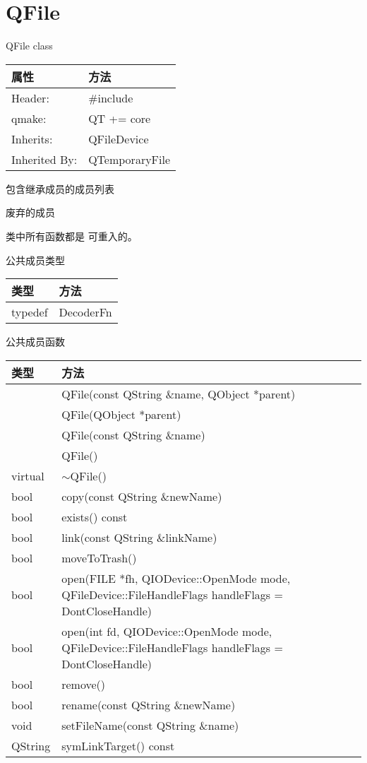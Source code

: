 \chapter{QFile}

QFile class 

\splitLine 

\begin{tabular}{|l|l|}
\hline
属性 	&方法\\
\hline
Header: &	\#include\\
\hline
qmake: &	QT += core\\
\hline
Inherits: &	QFileDevice\\
\hline
Inherited By:& 	QTemporaryFile\\
\hline
\end{tabular}

\begin{compactitem}
\item 包含继承成员的成员列表
\item 废弃的成员
\end{compactitem}


\begin{notice}
	类中所有函数都是 可重入的。
\end{notice}
 

\splitLine

公共成员类型

\begin{tabular}{|l|l|}
\hline
类型& 	方法\\
\hline
typedef& 	DecoderFn\\
\hline
\end{tabular}

\splitLine

公共成员函数

\begin{tabular}{|l|l|}
\hline
类型& 	方法\\
\hline
	&QFile(const QString \&name, QObject *parent)\\
\hline
	&QFile(QObject *parent)\\
\hline
	&QFile(const QString \&name)\\
\hline
	&QFile()\\
\hline
virtual& 	$\sim$QFile()\\
\hline
bool& 	copy(const QString \&newName)\\
\hline
bool& 	exists() const\\
\hline
bool& 	link(const QString \&linkName)\\
\hline
bool& 	moveToTrash()\\
\hline
bool& 	open(FILE *fh, QIODevice::OpenMode mode,
      QFileDevice::FileHandleFlags handleFlags = DontCloseHandle)\\
\hline
bool& 	open(int fd, QIODevice::OpenMode mode, QFileDevice::FileHandleFlags handleFlags = DontCloseHandle)\\
\hline
bool& 	remove()\\
\hline
bool& 	rename(const QString \&newName)\\
\hline
void& 	setFileName(const QString \&name)\\
\hline
QString& 	symLinkTarget() const\\
\hline
\end{tabular}

